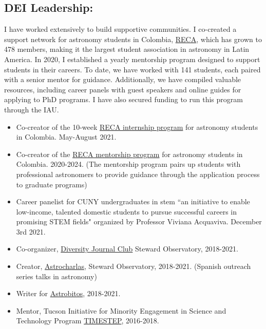 \documentclass[14pt]{article}
\begin{document}
\subsection*{DEI Leadership:}

I have worked extensively to build supportive communities. I co-created a support network for astronomy students in Colombia, \href{https://www.astroreca.org/}{RECA}, which has grown to 478 members, making it the largest student association in astronomy in Latin America. In 2020, I established a yearly mentorship program designed to support students in their careers. To date, we have worked with 141 students, each paired with a senior mentor for guidance. Additionally, we have compiled valuable resources, including career panels with guest speakers and online guides for applying to PhD programs. I have also secured funding to run this program through the IAU.


\begin{itemize}
  \setlength\itemsep{0.0em}
  \renewcommand\labelitemi{$\cdot$}
\item Co-creator of the 10-week
  \href{https://recastronomia.github.io/internship/}{RECA internship program}
  for astronomy students in Colombia. May-August 2021.
\item Co-creator of the \href{https://recastronomia.github.io/mentores/}{RECA mentorship program} for astronomy students in Colombia. 2020-2024.
  (The mentorship program pairs up students with professional astronomers to
  provide guidance through the application process to graduate programs)
\item Career panelist for CUNY undergraduates in stem ``an initiative to enable
  low-income, talented domestic students to pursue successful careers in
  promising STEM fields" organized by Professor Viviana Acquaviva. December 3rd 2021.  
\item Co-organizer,
  \href{https://www.as.arizona.edu/diversity_coffee/}{Diversity Journal Club} Steward Observatory, 2018-2021.
\item Creator, \href{https://astrocharlas.github.io/}{Astrocharlas},
Steward Observatory, 2018-2021.
 (Spanish outreach series talks in astronomy)
\item Writer for \href{https://astrobitos.org/}{Astrobitos}, 2018-2021.
\item Mentor, Tucson Initiative for Minority Engagement in Science and Technology Program \href{https://lavinia.as.arizona.edu/~timestep/}{TIMESTEP}, 2016-2018.
\end{itemize}
\end{document}
